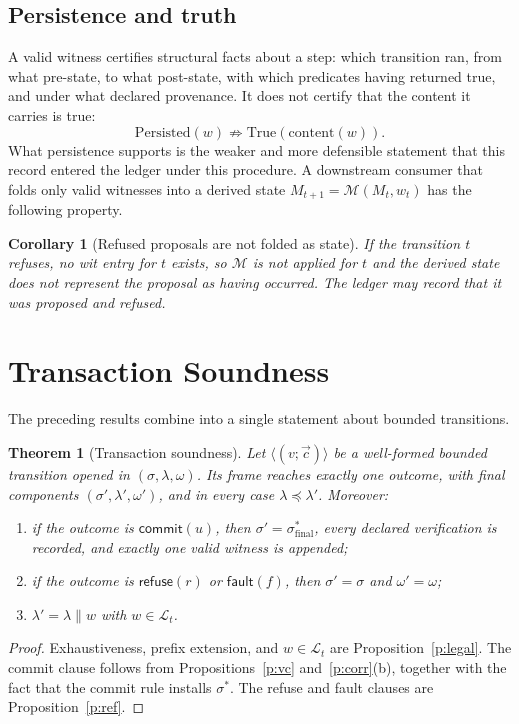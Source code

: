 \documentclass[11pt]{article}
\newtheorem{theorem}{Theorem}
\newtheorem{corollary}{Corollary}
\newcommand{\app}{\mathbin{\|}}
\newcommand{\pre}{\preceq}
\begin{document}
\subsection{Persistence and truth}

A valid witness certifies structural facts about a step: which transition ran, from what pre-state, to what post-state, with which predicates having returned true, and under what declared provenance. It does not certify that the content it carries is true:
\[
\mathrm{Persisted}(w)\not\Rightarrow\mathrm{True}(\mathrm{content}(w)).
\]
What persistence supports is the weaker and more defensible statement that this record entered the ledger under this procedure. A downstream consumer that folds only valid witnesses into a derived state $M_{t+1}=\mathcal M(M_t,w_t)$ has the following property.

\begin{corollary}[Refused proposals are not folded as state]
If the transition $t$ refuses, no \textsf{wit} entry for $t$ exists, so $\mathcal M$ is not applied for $t$ and the derived state does not represent the proposal as having occurred. The ledger may record that it was proposed and refused.
\end{corollary}

\section{Transaction Soundness}\label{s:sound}

The preceding results combine into a single statement about bounded transitions.

\begin{theorem}[Transaction soundness]\label{t:sound}
Let $\langle\!(v;\vec c)\!\rangle$ be a well-formed bounded transition opened in $(\sigma,\lambda,\omega)$. Its frame reaches exactly one outcome, with final components $(\sigma',\lambda',\omega')$, and in every case $\lambda\pre\lambda'$. Moreover:
\begin{enumerate}[label=(\roman*)]
\item if the outcome is $\mathsf{commit}(u)$, then $\sigma'=\sigma^{\ast}_{\mathrm{final}}$, every declared verification is recorded, and exactly one valid witness is appended;
\item if the outcome is $\mathsf{refuse}(r)$ or $\mathsf{fault}(f)$, then $\sigma'=\sigma$ and $\omega'=\omega$;
\item $\lambda'=\lambda\app w$ with $w\in\mathcal L_t$.
\end{enumerate}
\end{theorem}
\begin{proof}
Exhaustiveness, prefix extension, and $w\in\mathcal L_t$ are Proposition~\ref{p:legal}. The commit clause follows from Propositions~\ref{p:vc} and~\ref{p:corr}(b), together with the fact that the commit rule installs $\sigma^{\ast}$. The refuse and fault clauses are Proposition~\ref{p:ref}.
\end{proof}
\end{document}
